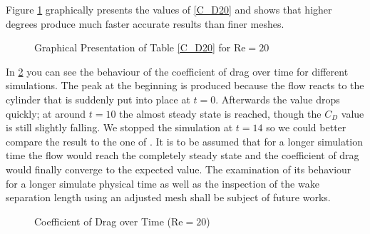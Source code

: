 Figure \ref{fig:C_D20} graphically presents the values of \cref{C_D20} and shows that higher degrees produce much faster accurate results than finer meshes. \\\indent
	\begin{figure}[htp]	
		\centering
		\caption{Graphical Presentation of Table \ref{C_D20} for $\text{Re} = 20$}
		\label{fig:C_D20}	
	\end{figure}
	In \cref{fig:C_Dt} you can see the behaviour of the coefficient of drag over time for different simulations. The peak at the beginning is produced because the flow reacts to the cylinder that is suddenly put into place at $t=0$. Afterwards the value drops quickly; at around $t=10$ the almost steady state is reached, though the $C_D$ value is still slightly falling. We stopped the simulation at $t=14$ so we could better compare the result to the one of \cite{ayers}. It is to be assumed that for a longer simulation time the flow would reach the completely steady state and the coefficient of drag would finally converge to the expected value. The examination of its behaviour for a longer simulate physical time as well as the inspection of the wake separation length using an adjusted mesh shall be subject of future works.\\\indent
\begin{figure}[htp]	
	\centering
	\caption{Coefficient of Drag over Time ($\text{Re} = 20$)}
	\label{fig:C_Dt}	
\end{figure}
